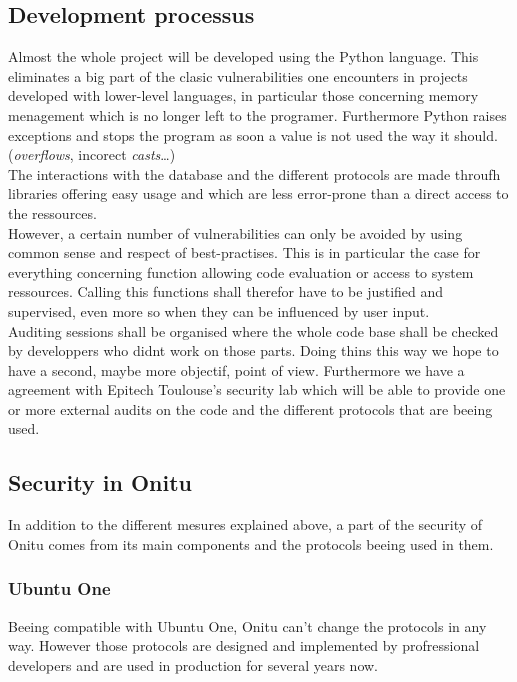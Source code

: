 \subsection{Development processus}

Almost the whole project will be developed using the Python language. This eliminates a big part of the clasic vulnerabilities one encounters in projects developed with lower-level languages, in particular those concerning memory menagement which is no longer left to the programer. Furthermore Python raises exceptions and stops the program as soon a value is not used the way it should. (\textit{overflows}, incorect \textit{casts}…)\\

The interactions with the database and the different protocols are made throufh libraries offering easy usage and which are less error-prone than a direct access to the ressources.\\

However, a certain number of vulnerabilities can only be avoided by using common sense and respect of best-practises. This is in particular the case for everything concerning function allowing code evaluation or access to system ressources. Calling this functions shall therefor have to be justified and supervised, even more so when they can be influenced by user input.\\

Auditing sessions shall be organised where the whole code base shall be checked by developpers who didnt work on those parts. Doing thins this way we hope to have a second, maybe more objectif, point of view. Furthermore we have a agreement with Epitech Toulouse's security lab which will be able to provide one or more external audits on the code and the different protocols that are beeing used.

\subsection{Security in Onitu}

In addition to the different mesures explained above, a part of the security of Onitu comes from its main components and the protocols beeing used in them.

\subsubsection{Ubuntu One}
Beeing compatible with Ubuntu One, Onitu can't change the protocols in any way. However those protocols are designed and implemented by profressional developers and are used in production for several years now.\\

